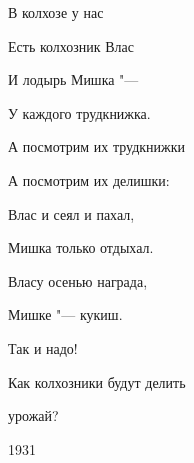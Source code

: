 \begin{flushleft}
    В колхозе у нас 
    
    Есть колхозник Влас 
    
    И лодырь Мишка "--- 
    
    У каждого трудкнижка. 
    
    А посмотрим их трудкнижки 
    
    А посмотрим их делишки: 
    
    Влас и сеял и пахал, 
    
    Мишка только отдыхал.

    Власу осенью награда, 
    
    Мишке "--- кукиш. 
    
    Так и надо!
    
    Как колхозники будут делить 
    
    урожай?     
\end{flushleft}

\begin{center}
    1931 
\end{center}